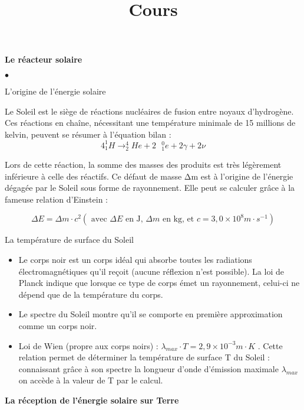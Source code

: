\documentclass[10pt]{article}
\newcommand{\titreActivite}{Cours} %
\begin{document}
\date{}
\title{\titreActivite}
\maketitle %


\begin{center}
	\textbf{\huge Le réacteur solaire}
\end{center}
\begin{list}{$\bullet$}{}
	\item L’origine de l’énergie solaire

	      Le Soleil est le siège de réactions nucléaires de fusion entre noyaux d’hydrogène.
	      Ces réactions en chaîne, nécessitant une température minimale de 15 millions de kelvin,
	      peuvent se résumer à l’équation bilan :
	      $$4 ^1_1​H→_2^4He+ 2\text{ } _1^0​e+2γ+2ν$$

	      Lors de cette réaction, la somme des masses des produits est très légèrement inférieure à celle des réactifs. Ce défaut de masse Δm est à l’origine de l’énergie dégagée
	      par le Soleil sous forme de rayonnement. Elle peut
	      se calculer grâce à la fameuse relation d’Einstein :

	      $$ΔE=Δm⋅c^2 (\text{ avec  }ΔE \text{  en J,  }Δm\text{ en kg, et  } c=3,0×10^8m·s^{-1})$$

	\item La température de surface du Soleil
	      \begin{itemize}
		      \item Le corps noir est un corps idéal qui absorbe toutes les radiations électromagnétiques qu’il reçoit
		            (aucune réflexion n'est possible).
		            La loi de Planck indique que lorsque ce type de corps émet un rayonnement,
		            celui-ci ne dépend que de la température du corps.
		      \item Le spectre du Soleil montre qu'il se comporte en première approximation comme un corps noir.
		      \item Loi de Wien (propre aux corps noirs) : $λ_{max}⋅T=2,9×10^{-3}m·K$ .
		            Cette relation permet de déterminer la température de surface T du Soleil :
		            connaissant grâce à son spectre la longueur d’onde d’émission maximale $λ_{max​}$
		            on accède à la valeur de T par le calcul.
	      \end{itemize}
\end{list}


\begin{center}
	\textbf{\huge La réception de l’énergie solaire sur Terre}
\end{center}
\end{document}
